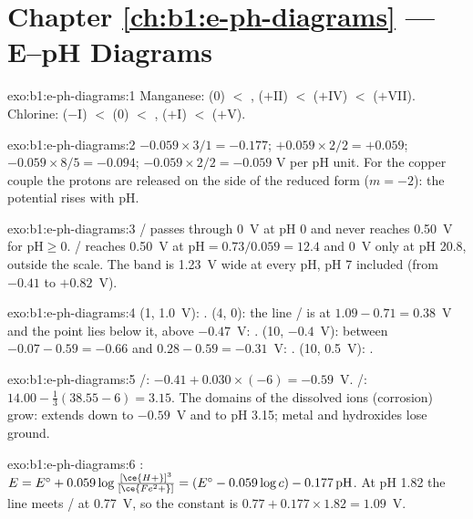 \section*{Chapter \ref{ch:b1:e-ph-diagrams} --- E--pH Diagrams}

\begin{solution}{exo:b1:e-ph-diagrams:1}
Manganese:  (0) $<$ ,  ($+$II) $<$ 
($+$IV) $<$  ($+$VII). Chlorine:  ($-$I) $<$  (0)
$<$ ,  ($+$I) $<$  ($+$V).
\end{solution}

\begin{solution}{exo:b1:e-ph-diagrams:2}
$-0.059 \times 3/1 = -0.177$; $+0.059 \times 2/2 = +0.059$;
$-0.059 \times 8/5 = -0.094$; $-0.059 \times 2/2 = -0.059$ V per pH unit.
For the copper couple the protons are released on the side of the reduced
form ($m = -2$): the potential rises with pH.
\end{solution}

\begin{solution}{exo:b1:e-ph-diagrams:3}
/ passes through 0~V at pH 0 and never reaches 0.50~V for
$\mathrm{pH} \geqslant 0$. / reaches 0.50~V at
$\mathrm{pH} = 0.73/0.059 = 12.4$ and 0~V only at pH 20.8, outside the
scale. The band is \qty{1.23}{V} wide at every pH, pH 7 included
(from $-0.41$ to $+0.82$~V).
\end{solution}

\begin{solution}{exo:b1:e-ph-diagrams:4}
(1, 1.0~V): . (4, 0): the line / is at
$1.09 - 0.71 = 0.38$~V and the point lies below it, above $-0.47$~V:
. (10, $-0.4$~V): between $-0.07 - 0.59 = -0.66$ and $0.28 -
0.59 = -0.31$~V: . (10, 0.5~V): .
\end{solution}

\begin{solution}{exo:b1:e-ph-diagrams:5}
/: $-0.41 + 0.030 \times (-6) = -0.59$~V.
/: $14.00 - \frac13(38.55 - 6) = 3.15$. The domains of
the dissolved ions (corrosion) grow:  extends down to $-0.59$~V
and  to pH 3.15; metal and hydroxides lose ground.
\end{solution}

\begin{solution}{exo:b1:e-ph-diagrams:6}
: $E = E^\circ + 0.059\log\frac{[\ce{H+}]^3}{[\ce{Fe^2+}]}
= (E^\circ - 0.059\log c) - 0.177\,\mathrm{pH}$. At pH 1.82 the line meets
/ at 0.77~V, so the constant is $0.77 + 0.177 \times 1.82
= 1.09$~V.
\end{solution}

